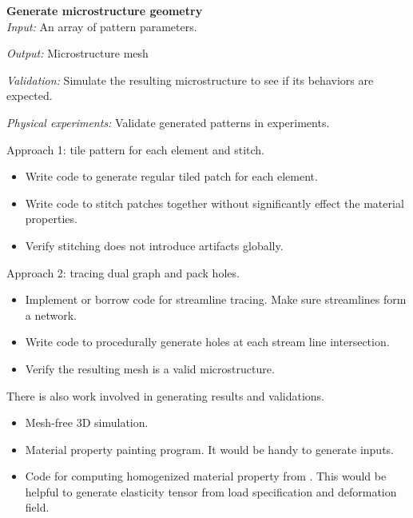 \begin{description}
\item{\bf Generate microstructure geometry}\\
{\it Input:} An array of pattern parameters.

{\it Output:} Microstructure mesh

{\it Validation:} Simulate the resulting microstructure to see if its behaviors
are expected.

{\it Physical experiments:} Validate generated patterns in experiments.

Approach 1: tile pattern for each element and stitch.
\begin{itemize}
\item Write code to generate regular tiled patch for each element.
\item Write code to stitch patches together without significantly effect the material
properties.
\item Verify stitching does not introduce artifacts globally.
\end{itemize}

Approach 2: tracing dual graph and pack holes.
\begin{itemize}
\item Implement or borrow code for streamline tracing.  Make sure streamlines
form a network.
\item Write code to procedurally generate holes at each stream line
intersection.
\item Verify the resulting mesh is a valid microstructure.
\end{itemize}
\end{description}



There is also work involved in generating results and validations.
\begin{itemize}
\item Mesh-free 3D simulation.
\item Material property painting program.  It would be handy to generate
inputs.
\item Code for computing homogenized material property from
\cite{Kharevych2009}.  This would be helpful to generate elasticity tensor from
load specification and deformation field.
\end{itemize}



